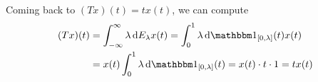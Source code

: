\documentclass[../../script.tex]{subfiles}
\begin{document}
\begin{eg}
    Coming back to $(Tx)(t) = t x(t)$, we can compute 
    \begin{align*}
        (Tx)(t) &= \int_{-\infty}^{\infty} \lambda \dd{E_{\lambda}x(t)} = \int_0^1 \lambda \dd{\charfun_{[0, \lambda]}(t) x(t)} \\
        &= x(t) \int_0^1 \lambda \dd{\charfun_{[0, \lambda]}(t)} = x(t) \cdot t \cdot 1 = t x(t)
    \end{align*}
\end{eg}
\end{document}
